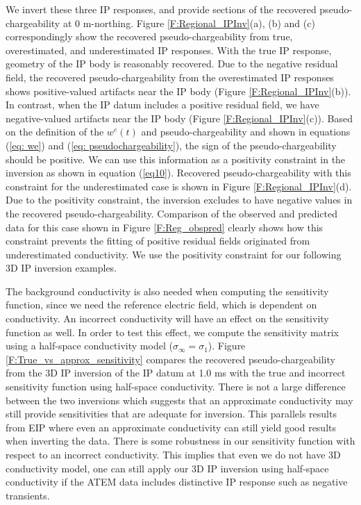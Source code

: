 \documentclass[a4paper, 11pt]{article}
\newcommand{\siginf}{\sigma_\infty}
\begin{document}
We invert these three IP responses, and provide sections of the recovered pseudo-chargeability at 0 m-northing. 
Figure \ref{F:Regional_IPInv}(a), (b) and (c) correspondingly show the recovered pseudo-chargeability from true, overestimated, and underestimated IP responses. 
With the true IP response, geometry of the IP body is reasonably recovered. 
Due to the negative residual field, the recovered pseudo-chargeability from the overestimated IP responses shows positive-valued artifacts near the IP body (Figure \ref{F:Regional_IPInv}(b)). 
In contrast, when the IP datum includes a positive residual field, we have negative-valued artifacts near the IP body (Figure \ref{F:Regional_IPInv}(c)). 
Based on the definition of the  $w^e(t)$ and pseudo-chargeability and shown in equations (\ref{eq: we}) and (\ref{eq: pseudochargeability}), the sign of the pseudo-chargeability should be positive. 
We can use this information as a positivity constraint in the inversion as shown in equation (\ref{eq10}). 
Recovered pseudo-chargeability with this constraint for the underestimated case is shown in Figure \ref{F:Regional_IPInv}(d). 
Due to the positivity constraint, the inversion excludes to have negative values in the recovered pseudo-chargeability. 
Comparison of the observed and predicted data for this case shown in Figure \ref{F:Reg_obspred} clearly shows how this constraint prevents the fitting of positive residual fields originated from underestimated conductivity. We use the positivity  constraint for our following 3D IP inversion examples. 

The background conductivity is also needed when computing the sensitivity function, since we need the reference electric field, which is dependent on conductivity. 
An incorrect conductivity will have an effect on the sensitivity function as well. 
In order to test this effect, we compute the sensitivity  matrix using a half-space conductivity model ($\siginf = \sigma_1$). 
Figure \ref{F:True_vs_approx_sensitivity} compares the recovered pseudo-chargeability from the 3D IP inversion of the IP datum at 1.0 ms with the true and incorrect sensitivity function using half-space conductivity. 
There is not a large difference between the two inversions  which suggests that an approximate conductivity may still provide sensitivities that are adequate for inversion. This parallels results from EIP where even an approximate conductivity can still yield good results when inverting the data. There is some robustness in our sensitivity function with respect to an  incorrect conductivity. 
This implies that even we do not have 3D conductivity model, one can still apply our 3D IP inversion using half-space conductivity if the ATEM data includes distinctive IP response such as negative transients.
\end{document}
